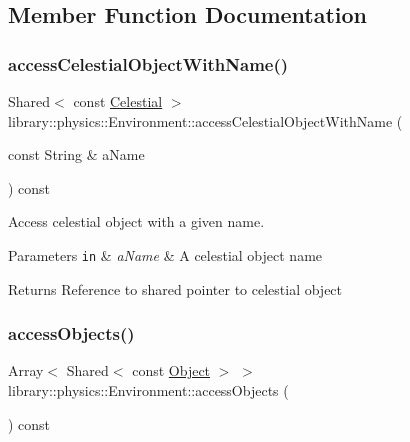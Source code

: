 \subsection{Member Function Documentation}
\mbox{\label{classlibrary_1_1physics_1_1_environment_a3dd52e151e9f09788d46072095bd48a6}} 
\subsubsection{\texorpdfstring{access\+Celestial\+Object\+With\+Name()}{accessCelestialObjectWithName()}}
{\footnotesize\ttfamily Shared$<$ const \hyperlink{classlibrary_1_1physics_1_1env_1_1obj_1_1_celestial}{Celestial} $>$ library\+::physics\+::\+Environment\+::access\+Celestial\+Object\+With\+Name (\begin{DoxyParamCaption}\item[{const String \&}]{a\+Name }\end{DoxyParamCaption}) const}



Access celestial object with a given name. 


\begin{DoxyParams}[1]{Parameters}
\mbox{\tt in}  & {\em a\+Name} & A celestial object name \\
\hline
\end{DoxyParams}
\begin{DoxyReturn}{Returns}
Reference to shared pointer to celestial object 
\end{DoxyReturn}
\mbox{\label{classlibrary_1_1physics_1_1_environment_a109b7156dadfe992126e01c629146a75}} 
\subsubsection{\texorpdfstring{access\+Objects()}{accessObjects()}}
{\footnotesize\ttfamily Array$<$ Shared$<$ const \hyperlink{classlibrary_1_1physics_1_1env_1_1_object}{Object} $>$ $>$ library\+::physics\+::\+Environment\+::access\+Objects (\begin{DoxyParamCaption}{ }\end{DoxyParamCaption}) const}



